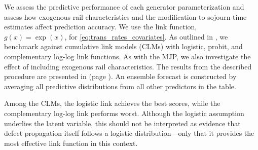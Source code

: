We assess the predictive performance of each generator parameterization and assess how exogenous rail characteristics and the modification to sojourn time estimates affect prediction accuracy. We use the link function, $g(x) = \exp(x)$, for \cref{eq:trans_rates_covariates}. 
As outlined in , we benchmark against cumulative link models (CLMs) with logistic, probit, and complementary log-log link functions. As with the MJP, we also investigate the effect of including exogenous rail characteristics.
The results from the described procedure are presented in  (page \pageref{tab:forecast_error_tab}). An ensemble forecast is constructed by averaging all predictive distributions from all other predictors in the table.

\begin{table}[htb!]
    \centering
    \caption{Prediction errors from $k$-fold cross-prediction procedures in terms of average ranked probability score ($\overline{\text{RPS}}$) and average log score ($\overline{\text{LogS}}$). ``Exogeneous information'' refers to whether or not the rail characteristics described in  are included in the model.}

    \label{tab:forecast_error_tab}
\end{table}


Among the CLMs, the logistic link achieves the best scores, while the complementary log-log link performs worst. Although the logistic assumption underlies the latent variable, this should not be interpreted as evidence that defect propagation itself follows a logistic distribution—only that it provides the most effective link function in this context.

